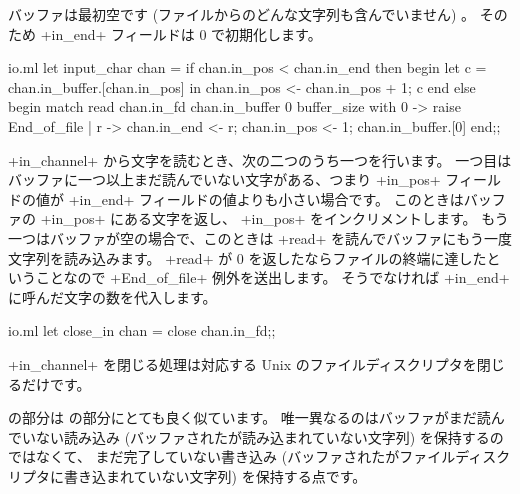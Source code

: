 バッファは最初空です (ファイルからのどんな文字列も含んでいません) 。
そのため \ml+in_end+ フィールドは 0 で初期化します。
%
\begin{listingcodefile}{io.ml}
let input_char chan =
  if chan.in_pos < chan.in_end then begin
    let c =  chan.in_buffer.[chan.in_pos] in
      chan.in_pos <- chan.in_pos + 1;
      c
  end else begin
    match read chan.in_fd chan.in_buffer 0 buffer_size
    with 0 -> raise End_of_file
       | r -> chan.in_end <- r;
              chan.in_pos <- 1;
              chan.in_buffer.[0]
  end;;
\end{listingcodefile}
%
\ml+in_channel+ から文字を読むとき、次の二つのうち一つを行います。
一つ目はバッファに一つ以上まだ読んでいない文字がある、つまり \ml+in_pos+ フィールドの値が
\ml+in_end+ フィールドの値よりも小さい場合です。
このときはバッファの \ml+in_pos+ にある文字を返し、 \ml+in_pos+ をインクリメントします。
もう一つはバッファが空の場合で、このときは \ml+read+ を読んでバッファにもう一度文字列を読み込みます。
\ml+read+ が 0 を返したならファイルの終端に達したということなので \ml+End_of_file+ 例外を送出します。
そうでなければ \ml+in_end+ に呼んだ文字の数を代入します。
%
\begin{listingcodefile}{io.ml}
let close_in chan =
  close chan.in_fd;;
\end{listingcodefile}
%
\ml+in_channel+ を閉じる処理は対応する Unix のファイルディスクリプタを閉じるだけです。

 の部分は  の部分にとても良く似ています。
唯一異なるのはバッファがまだ読んでいない読み込み (バッファされたが読み込まれていない文字列) を保持するのではなくて、
まだ完了していない書き込み (バッファされたがファイルディスクリプタに書き込まれていない文字列)
を保持する点です。

